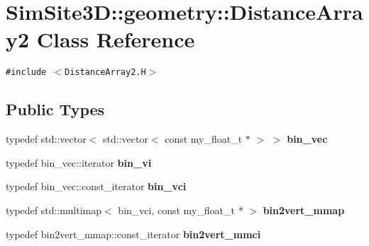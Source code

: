 \section{SimSite3D::geometry::Distance\-Array2 Class Reference}
\label{classSimSite3D_1_1geometry_1_1DistanceArray2}
{\tt \#include $<$Distance\-Array2.H$>$}

\subsection*{Public Types}
\begin{CompactItemize}
\item 
typedef std::vector$<$ std::vector$<$ const my\_\-float\_\-t $\ast$ $>$ $>$ \textbf{bin\_\-vec}\label{classSimSite3D_1_1geometry_1_1DistanceArray2_5671c6bffbec6d424869132a9b8278fe}

\item 
typedef bin\_\-vec::iterator \textbf{bin\_\-vi}\label{classSimSite3D_1_1geometry_1_1DistanceArray2_3b8950a2f913a1c99f07cd8207b8d4c7}

\item 
typedef bin\_\-vec::const\_\-iterator \textbf{bin\_\-vci}\label{classSimSite3D_1_1geometry_1_1DistanceArray2_edfb950bc7209814dc46236e34e2dc31}

\item 
typedef std::multimap$<$ bin\_\-vci, const my\_\-float\_\-t $\ast$ $>$ \textbf{bin2vert\_\-mmap}\label{classSimSite3D_1_1geometry_1_1DistanceArray2_1cb8df28537da9c452689b0424c4f38b}

\item 
typedef bin2vert\_\-mmap::const\_\-iterator \textbf{bin2vert\_\-mmci}\label{classSimSite3D_1_1geometry_1_1DistanceArray2_0e789f5551c49ffa057399daf777fb66}

\end{CompactItemize}
